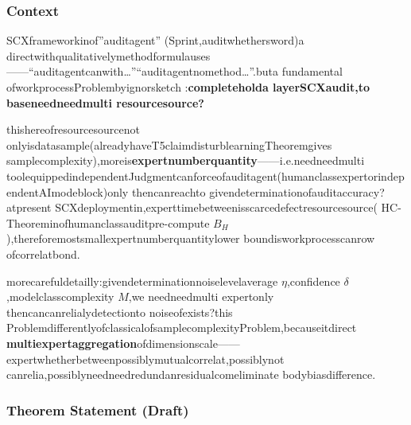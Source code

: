 \documentclass[
  12pt,
]{article}
\begin{document}
\subsubsection{Context}\label{ux8bedux5883-2}

SCXframeworkinof''auditagent''  (Sprint,auditwhethersword)a directwithqualitativelymethodformulauses------``auditagentcanwith\ldots{}''``auditagentnomethod\ldots{}''.buta  fundamental ofworkprocessProblembyignorsketch :\textbf{completeholda layerSCXaudit,to baseneedneedmulti resourcesource?}

thishereofresourcesourcenot onlyisdatasample(alreadyhaveT5claimdisturblearningTheoremgives samplecomplexity),moreis\textbf{expertnumberquantity}------i.e.needneedmulti toolequippedindependentJudgmentcanforceofauditagent(humanclassexpertorindependentAImodeblock)only thencanreachto givendeterminationofauditaccuracy?atpresent SCXdeploymentin,experttimebetweenisscarcedefectresourcesource( HC-Theoreminofhumanclassauditpre-compute
\(B_H\)),thereforemostsmallexpertnumberquantitylower boundisworkprocesscanrow ofcorrelatbond.

morecarefuldetailly:givendeterminationnoiselevelaverage \(\eta\),confidence \(\delta\),modelclasscomplexity
\(M\),we needneedmulti expertonly thencancanrelialydetectionto noiseofexists?this ProblemdifferentlyofclassicalofsamplecomplexityProblem,becauseitdirect  \textbf{multiexpertaggregation}ofdimensionscale------expertwhetherbetweenpossiblymutualcorrelat,possiblynot canrelia,possiblyneedneedredundanresidualcomeliminate bodybiasdifference.

\subsubsection{Theorem Statement (Draft)}\label{ux5b9aux7406ux9648ux8ff0ux8349ux6848-2}
\end{document}
